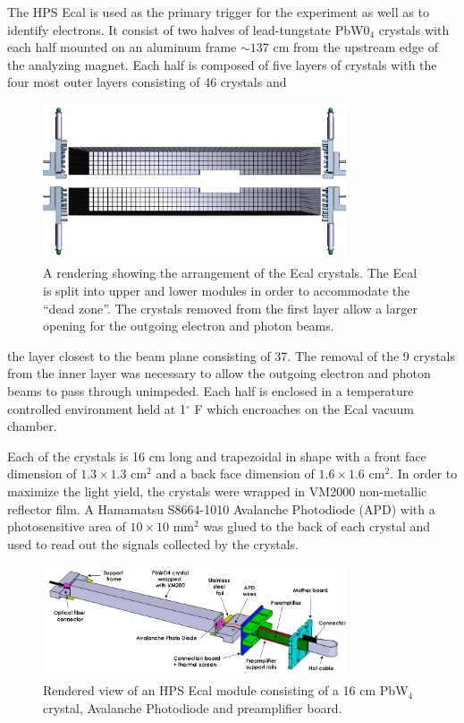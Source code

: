 The HPS Ecal is used as the primary trigger for the experiment as well as to
identify electrons.  It consist of two halves of lead-tungstate 
PbW0$_4$ crystals with each half mounted on an aluminum frame $\sim 137$ cm 
from the upstream edge of the analyzing magnet.  Each half is composed of five
layers of crystals with the four most outer layers consisting of 46 crystals and 
\begin{figure}
    \centering
    \includegraphics[width=0.8\textwidth]{images/ecal_layout.png}
    \caption{A rendering showing the arrangement of the Ecal crystals.  The Ecal
             is split into upper and lower modules in order to accommodate the 
             ``dead zone''.  The crystals removed from the first layer allow
             a larger opening for the outgoing electron and photon beams.}
    \label{fig:ecal_layout}
\end{figure}
the layer closest to the beam plane consisting of 37. The removal of the 9 
crystals from the inner layer was necessary to allow the outgoing electron and
photon beams to pass through unimpeded.  Each half is enclosed in a temperature
controlled environment held at 1$^{\circ}$ F which encroaches on the Ecal 
vacuum chamber.

Each of the crystals is 16 cm long and trapezoidal in shape with a front face
dimension of $1.3 \times 1.3$ cm$^2$ and a back face dimension of $1.6 \times
1.6$ cm$^2$.  In order to maximize the light yield, the crystals were wrapped
in VM2000 non-metallic reflector film. A Hamamatsu S8664-1010 Avalanche 
Photodiode (APD) with a photosensitive area of $10 \times 10$ mm$^2$ was glued
to the back of each crystal and used to read out the signals collected by the
crystals.  
\begin{figure}
    \centering
    \includegraphics[width=0.8\textwidth]{images/ecal_crystal.png}
    \caption{Rendered view of an HPS Ecal module consisting of a 16 cm PbW$_4$
             crystal, Avalanche Photodiode and preamplifier board.}
    \label{fig:ecal_crystal}
\end{figure}

